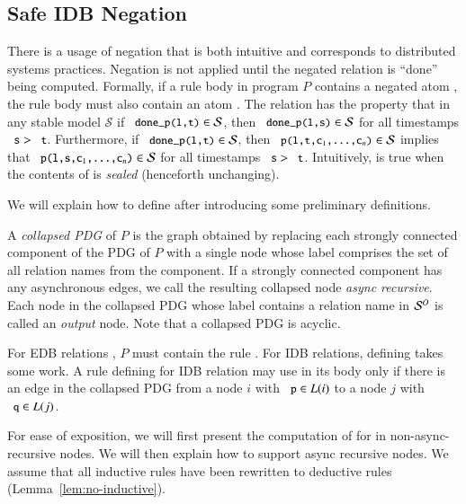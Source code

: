 \subsection{Safe IDB Negation}
\label{sec:perfect-construction}

There is a usage of negation that is both intuitive and corresponds to distributed systems practices.  Negation is not applied until the negated relation is ``done'' being computed.  Formally, if a rule body in program $P$ contains a negated atom , the rule body must also contain an atom .  The relation  has the property that in any stable model $\mathcal{S}$ if $\dedalus{done_p(l,t)} \in \mathcal{S}$,  then $\dedalus{done_p(l,s)} \in \mathcal{S}$ for all timestamps $\dedalus{s} > \dedalus{t}$.  Furthermore, if $\dedalus{done_p(l,t)} \in \mathcal{S}$, then $\dedalus{p(l,t,c\sub{1},\ldots,c\sub{n})} \in \mathcal{S}$ implies that $\dedalus{p(l,s,c\sub{1},\ldots,c\sub{n})} \in \mathcal{S}$ for all timestamps $\dedalus{s} > \dedalus{t}$.  Intuitively,  is true when the contents of  is {\em sealed} (henceforth unchanging).

We will explain how to define  after introducing some preliminary definitions.

A {\em collapsed PDG} of $P$ is the graph obtained by replacing each strongly
connected component of the PDG of $P$ with a single node whose label comprises
the set of all relation names from the component.  If a strongly connected
component has any asynchronous edges, we call the resulting collapsed node {\em
  async recursive}.  Each node in the collapsed PDG whose label contains a
relation name in $\mathcal{S}^O$ is called an {\em output} node.  Note that a
collapsed PDG is acyclic.

For EDB relations , $P$ must contain the rule .  For
IDB relations, defining  takes some work.  A rule defining
 for IDB relation  may use  in
its body only if there is an edge in the collapsed PDG from a node $i$ with
$\dedalus{p} \in L(i)$ to a node $j$ with $\dedalus{q} \in L(j)$.

For ease of exposition, we will first present the computation of  for  in non-async-recursive nodes.  We will then explain how to support async recursive nodes.  We assume that all inductive rules have been rewritten to deductive rules (Lemma~\ref{lem:no-inductive}).

